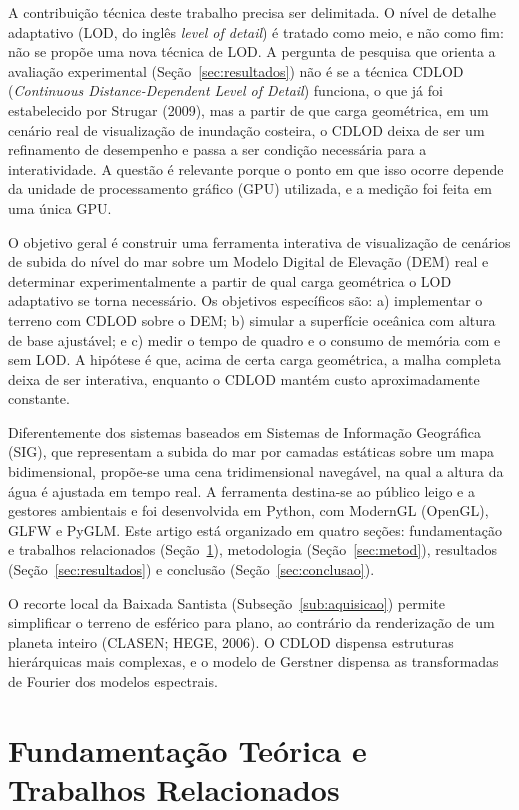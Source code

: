 \documentclass[conference]{IEEEtran}
\begin{document}
A contribuição técnica deste trabalho precisa ser delimitada. O nível de
detalhe adaptativo (LOD, do inglês \emph{level of detail}) é tratado como
meio, e não como fim: não se propõe uma nova técnica de LOD. A pergunta de
pesquisa que orienta a avaliação experimental (Seção~\ref{sec:resultados})
não é se a técnica CDLOD (\emph{Continuous Distance-Dependent Level of
Detail}) funciona, o que já foi estabelecido por Strugar (2009),
mas a partir de que carga geométrica, em um cenário real de visualização
de inundação costeira, o CDLOD deixa de ser um refinamento de desempenho e
passa a ser condição necessária para a interatividade. A questão é relevante porque o ponto em que isso ocorre depende da unidade de processamento gráfico (GPU) utilizada, e a medição foi feita em uma única GPU.

O objetivo geral é construir uma ferramenta interativa de visualização de
cenários de subida do nível do mar sobre um Modelo Digital de Elevação
(DEM) real e determinar experimentalmente a partir de qual carga geométrica
o LOD adaptativo se torna necessário. Os objetivos específicos são: a)
implementar o terreno com CDLOD sobre o DEM; b) simular a superfície
oceânica com altura de base ajustável; e c) medir o tempo de quadro e o
consumo de memória com e sem LOD. A hipótese é que, acima de certa carga geométrica, a malha completa deixa de ser interativa, enquanto o CDLOD mantém custo aproximadamente constante.

Diferentemente dos sistemas baseados em Sistemas de Informação Geográfica
(SIG), que representam a subida do mar por camadas estáticas sobre um mapa
bidimensional, propõe-se uma cena tridimensional navegável, na qual a altura
da água é ajustada em tempo real. A ferramenta destina-se ao público leigo e
a gestores ambientais e foi desenvolvida em Python, com ModernGL (OpenGL),
GLFW e PyGLM. Este artigo está organizado em quatro seções: fundamentação e
trabalhos relacionados (Seção~\ref{sec:fund}), metodologia
(Seção~\ref{sec:metod}), resultados (Seção~\ref{sec:resultados}) e
conclusão (Seção~\ref{sec:conclusao}).

O recorte local da Baixada Santista (Subseção~\ref{sub:aquisicao}) permite simplificar o terreno de esférico para plano, ao contrário da renderização de um planeta inteiro (CLASEN; HEGE, 2006). O CDLOD dispensa estruturas hierárquicas mais complexas, e o modelo de Gerstner dispensa as transformadas de Fourier dos modelos espectrais.

\section{Fundamentação Teórica e Trabalhos Relacionados}
\label{sec:fund}
\end{document}
